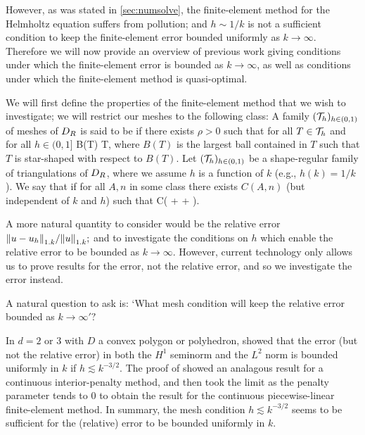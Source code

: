 However, as was stated in \cref{sec:numsolve}, the finite-element method for the Helmholtz equation suffers from pollution; and $h \sim 1/k$ is not a sufficient condition to keep the finite-element error bounded uniformly as $k\rightarrow \infty.$ Therefore we will now provide an overview of previous work giving conditions under which the finite-element error is bounded as $k\rightarrow \infty$, as well as conditions under which the finite-element method is quasi-optimal.

We will first define the properties of the finite-element method that we wish to investigate; we will restrict our meshes to the following class:
A family $(\mathcal T_{h})_{h \in (0,1)}$ of meshes of $D_{R}$ is said to be  if there exists $\rho > 0$ such that for all $T \in \mathcal T_{h}$ and for all $h \in (0,1]$
  \beqs
\diam B(T) \geq \rho \diam T,
\eeqs
where $B(T)$ is the largest ball contained in $T$ such that $T$ is star-shaped with respect to $B(T)$.
\ede
{}
Let $(\mathcal T_{h})_{h \in (0,1)}$ be a  shape-regular family of triangulations of $D_{R}$, where we assume $h$ is a function of $k$ (e.g., $h(k) = 1/k$). We say that  if for all $A,n$ in some class there exists $C(A,n)$ (but independent of $k$ and $h$) such that
\beqs
{} \leq C\mleft( + \NLtGD{\gD} + \NLtGI{\gI}\mright).
\eeqs
\ede

A more natural quantity to consider would be the relative error $\NW{u-\uh}/\NW{u};$ and to investigate the conditions on $h$ which enable the relative error to be bounded as $k\rightarrow \infty.$ However, current technology only allows us to prove results for the error, not the relative error, and so we investigate the error instead.

A natural question to ask is: `What mesh condition will keep the relative error bounded as $k \rightarrow \infty'?$

 In $d=2$ or $3$ with $D$ a convex polygon or polyhedron,  \cite[Theorem 6.1]{Wu:14} showed that the error (but not the relative error) in both the $H^1$ seminorm and the $L^2$ norm is bounded uniformly in $k$ if $h \lesssim k^{-3/2}$. The proof of \cite[Theorem 6.1]{Wu:14} showed an analagous result for a continuous interior-penalty method, and then took the limit as the penalty parameter tends to 0 to obtain the result for the continuous piecewise-linear finite-element method. In summary, the mesh condition $h \lesssim k^{-3/2}$ seems to be sufficient for the (relative) error to be bounded uniformly in $k.$

